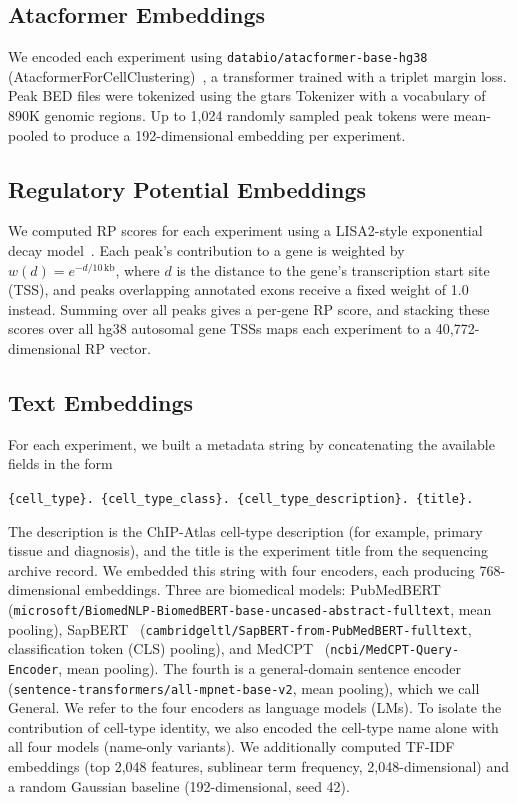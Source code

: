 \documentclass[12pt]{article}
\begin{document}
\subsection{Atacformer Embeddings}
\label{sec:atacformer}

We encoded each experiment using \nolinkurl{databio/atacformer-base-hg38}
(AtacformerForCellClustering)~\cite{atacformer}, a transformer trained with a
triplet margin loss. Peak BED files were tokenized using the gtars Tokenizer
with a vocabulary of 890K genomic regions. Up to 1,024 randomly sampled peak
tokens were mean-pooled to produce a 192-dimensional embedding per experiment.

\subsection{Regulatory Potential Embeddings}

We computed RP scores for each experiment using a LISA2-style exponential
decay model~\cite{lisa2}. Each peak's contribution to a gene is weighted by
$w(d) = e^{-d/10\,\text{kb}}$, where $d$ is the distance to the gene's
transcription start site (TSS), and peaks overlapping annotated exons receive a
fixed weight of 1.0 instead. Summing over all peaks gives a per-gene RP score,
and stacking these scores over all hg38 autosomal gene TSSs maps each
experiment to a 40,772-dimensional RP vector.

\subsection{Text Embeddings}
\label{sec:text_emb}

For each experiment, we built a metadata string by concatenating the
available fields in the form
\begin{center}
\texttt{\{cell\_type\}. \{cell\_type\_class\}. \{cell\_type\_description\}. \{title\}.}
\end{center}
The description is the ChIP-Atlas cell-type description (for example, primary
tissue and diagnosis), and the title is the experiment title from the
sequencing archive record. We embedded this string with four encoders, each
producing 768-dimensional embeddings. Three are biomedical models:
PubMedBERT~\cite{pubmedbert}
(\nolinkurl{microsoft/BiomedNLP-BiomedBERT-base-uncased-abstract-fulltext},
mean pooling), SapBERT~\cite{sapbert}
(\nolinkurl{cambridgeltl/SapBERT-from-PubMedBERT-fulltext}, classification
token (CLS) pooling), and MedCPT~\cite{medcpt}
(\nolinkurl{ncbi/MedCPT-Query-Encoder}, mean pooling). The fourth is a
general-domain sentence encoder~\cite{mpnet}
(\nolinkurl{sentence-transformers/all-mpnet-base-v2}, mean pooling), which we
call General. We refer to the four encoders as language models (LMs). To
isolate the contribution of cell-type identity, we also encoded the cell-type
name alone with all four models (name-only variants). We additionally
computed TF-IDF embeddings (top 2,048 features, sublinear term frequency,
2,048-dimensional) and a random Gaussian baseline (192-dimensional, seed 42).
\end{document}
